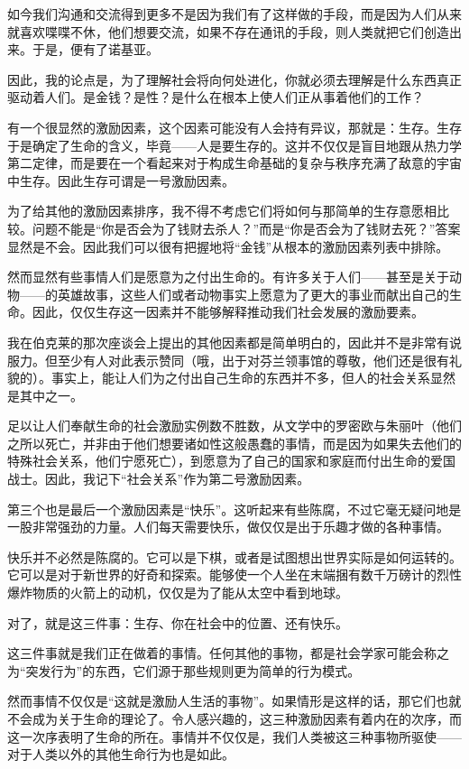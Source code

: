 如今我们沟通和交流得到更多不是因为我们有了这样做的手段，而是因为人们从来就喜欢喋喋不休，他们想要交流，如果不存在通讯的手段，则人类就把它们创造出来。于是，便有了诺基亚。

因此，我的论点是，为了理解社会将向何处进化，你就必须去理解是什么东西真正驱动着人们。是金钱？是性？是什么在根本上使人们正从事着他们的工作？

有一个很显然的激励因素，这个因素可能没有人会持有异议，那就是：生存。生存于是确定了生命的含义，毕竟——人是要生存的。这并不仅仅是盲目地跟从热力学第二定律，而是要在一个看起来对于构成生命基础的复杂与秩序充满了敌意的宇宙中生存。因此生存可谓是一号激励因素。

为了给其他的激励因素排序，我不得不考虑它们将如何与那简单的生存意愿相比较。问题不能是“你是否会为了钱财去杀人？”而是“你是否会为了钱财去死？”答案显然是不会。因此我们可以很有把握地将“金钱”从根本的激励因素列表中排除。

然而显然有些事情人们是愿意为之付出生命的。有许多关于人们——甚至是关于动物——的英雄故事，这些人们或者动物事实上愿意为了更大的事业而献出自己的生命。因此，仅仅生存这一因素并不能够解释推动我们社会发展的激励要素。

我在伯克莱的那次座谈会上提出的其他因素都是简单明白的，因此并不是非常有说服力。但至少有人对此表示赞同（哦，出于对芬兰领事馆的尊敬，他们还是很有礼貌的）。事实上，能让人们为之付出自己生命的东西并不多，但人的社会关系显然是其中之一。

足以让人们奉献生命的社会激励实例数不胜数，从文学中的罗密欧与朱丽叶（他们之所以死亡，并非由于他们想要诸如性这般愚蠢的事情，而是因为如果失去他们的特殊社会关系，他们宁愿死亡），到愿意为了自己的国家和家庭而付出生命的爱国战士。因此，我记下“社会关系”作为第二号激励因素。

第三个也是最后一个激励因素是“快乐”。这听起来有些陈腐，不过它毫无疑问地是一股非常强劲的力量。人们每天需要快乐，做仅仅是出于乐趣才做的各种事情。

快乐并不必然是陈腐的。它可以是下棋，或者是试图想出世界实际是如何运转的。它可以是对于新世界的好奇和探索。能够使一个人坐在末端捆有数千万磅计的烈性爆炸物质的火箭上的动机，仅仅是为了能从太空中看到地球。

对了，就是这三件事：生存、你在社会中的位置、还有快乐。

这三件事就是我们正在做着的事情。任何其他的事物，都是社会学家可能会称之为“突发行为”的东西，它们源于那些规则更为简单的行为模式。

然而事情不仅仅是“这就是激励人生活的事物”。如果情形是这样的话，那它们也就不会成为关于生命的理论了。令人感兴趣的，这三种激励因素有着内在的次序，而这一次序表明了生命的所在。事情并不仅仅是，我们人类被这三种事物所驱使——对于人类以外的其他生命行为也是如此。

